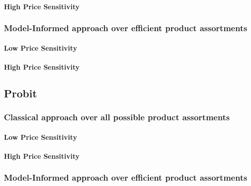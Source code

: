 

\paragraph{High Price Sensitivity}



\subsubsection{Model-Informed approach over efficient product assortments}

\paragraph{Low Price Sensitivity}



\paragraph{High Price Sensitivity}



\subsection{Probit}

\subsubsection{Classical approach over all possible product assortments}

\paragraph{Low Price Sensitivity}



\paragraph{High Price Sensitivity}



\subsubsection{Model-Informed approach over efficient product assortments}

